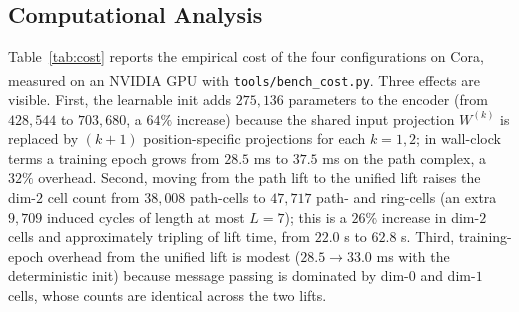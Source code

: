 \documentclass[letterpaper]{article} %
\begin{document}
\subsection{Computational Analysis} \label{subsec:cost}
Table~\ref{tab:cost} reports the empirical cost of the four configurations on Cora, measured on an NVIDIA\textsuperscript{\textregistered} GPU with \texttt{tools/bench\_cost.py}. Three effects are visible. First, the learnable init adds \(275{,}136\) parameters to the encoder (from \(428{,}544\) to \(703{,}680\), a \(64\%\) increase) because the shared input projection \(W^{(k)}\) is replaced by \((k + 1)\) position-specific projections for each \(k = 1, 2\); in wall-clock terms a training epoch grows from \(28.5\) ms to \(37.5\) ms on the path complex, a \(32\%\) overhead. Second, moving from the path lift to the unified lift raises the dim-\(2\) cell count from \(38{,}008\) path-cells to \(47{,}717\) path- and ring-cells (an extra \(9{,}709\) induced cycles of length at most \(L = 7\)); this is a \(26\%\) increase in dim-\(2\) cells and approximately tripling of lift time, from \(22.0\) s to \(62.8\) s. Third, training-epoch overhead from the unified lift is modest (\(28.5 \to 33.0\) ms with the deterministic init) because message passing is dominated by dim-\(0\) and dim-\(1\) cells, whose counts are identical across the two lifts.

\begin{table}[t]
\centering
{}
\caption{Measured cost of each configuration on Cora. \emph{Lift time} is one-off preprocessing (building the cell tables and boundary relations). \emph{Train epoch} is wall-clock time per full-graph training epoch, averaged over \(20\) epochs after \(3\) warm-up epochs. \emph{Parameters} counts learnable parameters in the encoder.}
\label{tab:cost}
\end{table}
\end{document}
